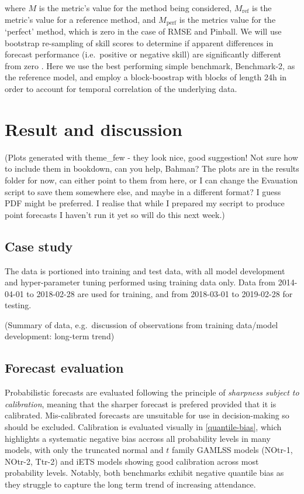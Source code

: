 \documentclass[]{elsarticle} %
\begin{document}
where \(M\) is the metric's value for the method being considered, \(M_\text{ref}\) is the metric's value for a reference method, and \(M_\text{perf}\) is the metrics value for the `perfect' method, which is zero in the case of RMSE and Pinball. We will use bootstrap re-sampling of skill scores to determine if apparent differences in forecast performance (i.e.~positive or negative skill) are significantly different from zero \citep{Efron1981Bootstrap}. Here we use the best performing simple benchmark, Benchmark-2, as the reference model, and employ a block-boostrap with blocks of length 24h in order to account for temporal correlation of the underlying data.

\hypertarget{result}{%
\section{Result and discussion}\label{result}}

(Plots generated with theme\_few - they look nice, good suggestion! Not sure how to include them in bookdown, can you help, Bahman? The plots are in the results folder for now, can either point to them from here, or I can change the Evauation script to save them somewhere else, and maybe in a different format? I guess PDF might be preferred. I realise that while I prepared my secript to produce point forecasts I haven't run it yet so will do this next week.)

\hypertarget{case-study}{%
\subsection{Case study}\label{case-study}}

The data is portioned into training and test data, with all model development and hyper-parameter tuning performed using training data only. Data from 2014-04-01 to 2018-02-28 are used for training, and from 2018-03-01 to 2019-02-28 for testing.

(Summary of data, e.g.~discussion of observations from training data/model development: long-term trend)

\hypertarget{forecast-evaluation}{%
\subsection{Forecast evaluation}\label{forecast-evaluation}}

Probabilistic forecasts are evaluated following the principle of \emph{sharpness subject to calibration}, meaning that the sharper forecast is prefered provided that it is calibrated. Mis-calibrated forecasts are unsuitable for use in decision-making so should be excluded. Calibration is evaluated visually in \ref{quantile-bias}, which highlights a systematic negative bias accross all probability levels in many models, with only the truncated normal and \(t\) family GAMLSS models (NOtr-1, NOtr-2, Ttr-2) and iETS models showing good calibration across most probability levels. Notably, both benchmarks exhibit negative quantile bias as they struggle to capture the long term trend of increasing attendance.
\end{document}
